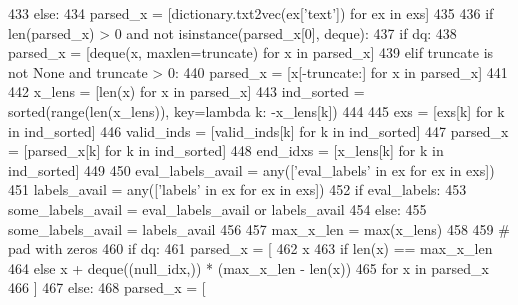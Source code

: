 \begin{DoxyCode}
433         \textcolor{keywordflow}{else}:
434             parsed\_x = [dictionary.txt2vec(ex[\textcolor{stringliteral}{'text'}]) \textcolor{keywordflow}{for} ex \textcolor{keywordflow}{in} exs]
435 
436         \textcolor{keywordflow}{if} len(parsed\_x) > 0 \textcolor{keywordflow}{and} \textcolor{keywordflow}{not} isinstance(parsed\_x[0], deque):
437             \textcolor{keywordflow}{if} dq:
438                 parsed\_x = [deque(x, maxlen=truncate) \textcolor{keywordflow}{for} x \textcolor{keywordflow}{in} parsed\_x]
439             \textcolor{keywordflow}{elif} truncate \textcolor{keywordflow}{is} \textcolor{keywordflow}{not} \textcolor{keywordtype}{None} \textcolor{keywordflow}{and} truncate > 0:
440                 parsed\_x = [x[-truncate:] \textcolor{keywordflow}{for} x \textcolor{keywordflow}{in} parsed\_x]
441 
442         x\_lens = [len(x) \textcolor{keywordflow}{for} x \textcolor{keywordflow}{in} parsed\_x]
443         ind\_sorted = sorted(range(len(x\_lens)), key=\textcolor{keyword}{lambda} k: -x\_lens[k])
444 
445         exs = [exs[k] \textcolor{keywordflow}{for} k \textcolor{keywordflow}{in} ind\_sorted]
446         valid\_inds = [valid\_inds[k] \textcolor{keywordflow}{for} k \textcolor{keywordflow}{in} ind\_sorted]
447         parsed\_x = [parsed\_x[k] \textcolor{keywordflow}{for} k \textcolor{keywordflow}{in} ind\_sorted]
448         end\_idxs = [x\_lens[k] \textcolor{keywordflow}{for} k \textcolor{keywordflow}{in} ind\_sorted]
449 
450         eval\_labels\_avail = any([\textcolor{stringliteral}{'eval\_labels'} \textcolor{keywordflow}{in} ex \textcolor{keywordflow}{for} ex \textcolor{keywordflow}{in} exs])
451         labels\_avail = any([\textcolor{stringliteral}{'labels'} \textcolor{keywordflow}{in} ex \textcolor{keywordflow}{for} ex \textcolor{keywordflow}{in} exs])
452         \textcolor{keywordflow}{if} eval\_labels:
453             some\_labels\_avail = eval\_labels\_avail \textcolor{keywordflow}{or} labels\_avail
454         \textcolor{keywordflow}{else}:
455             some\_labels\_avail = labels\_avail
456 
457         max\_x\_len = max(x\_lens)
458 
459         \textcolor{comment}{# pad with zeros}
460         \textcolor{keywordflow}{if} dq:
461             parsed\_x = [
462                 x
463                 \textcolor{keywordflow}{if} len(x) == max\_x\_len
464                 \textcolor{keywordflow}{else} x + deque((null\_idx,)) * (max\_x\_len - len(x))
465                 \textcolor{keywordflow}{for} x \textcolor{keywordflow}{in} parsed\_x
466             ]
467         \textcolor{keywordflow}{else}:
468             parsed\_x = [

\end{DoxyCode}

